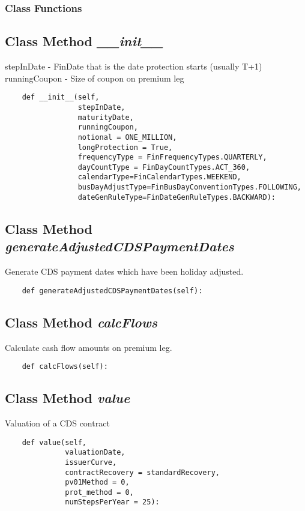 \documentclass[twoside,11pt]{book}
\begin{document}
\subsubsection{Class Functions}

\subsection{Class Method {\it \_\_init\_\_}}
stepInDate - FinDate that is the date protection starts (usually T+1) runningCoupon - Size of coupon on premium leg 

\begin{lstlisting}
    def __init__(self,
                 stepInDate,
                 maturityDate,
                 runningCoupon,
                 notional = ONE_MILLION,
                 longProtection = True,
                 frequencyType = FinFrequencyTypes.QUARTERLY,
                 dayCountType = FinDayCountTypes.ACT_360,
                 calendarType=FinCalendarTypes.WEEKEND,
                 busDayAdjustType=FinBusDayConventionTypes.FOLLOWING,
                 dateGenRuleType=FinDateGenRuleTypes.BACKWARD):
\end{lstlisting}

\subsection{Class Method {\it generateAdjustedCDSPaymentDates}}
Generate CDS payment dates which have been holiday adjusted.

\begin{lstlisting}
    def generateAdjustedCDSPaymentDates(self):
\end{lstlisting}

\subsection{Class Method {\it calcFlows}}
Calculate cash flow amounts on premium leg. 

\begin{lstlisting}
    def calcFlows(self):
\end{lstlisting}

\subsection{Class Method {\it value}}
Valuation of a CDS contract 

\begin{lstlisting}
    def value(self,
              valuationDate,
              issuerCurve,
              contractRecovery = standardRecovery,
              pv01Method = 0,
              prot_method = 0,
              numStepsPerYear = 25):
\end{lstlisting}
\end{document}
